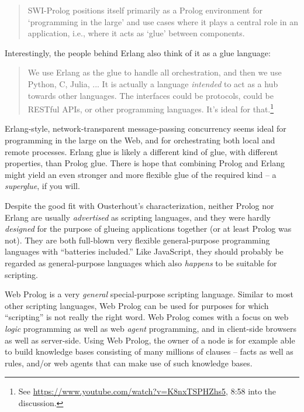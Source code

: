 \begin{quote}
SWI-Prolog positions itself primarily as a Prolog environment for `programming in the large' and use cases where it plays a central role in an application, i.e., where it acts as `glue' between components. 
\end{quote}

\noindent Interestingly, the people behind Erlang also think of it as a glue language: 

\begin{quote}
We use Erlang as the glue to handle all orchestration, and then we use Python, C, Julia, ... It is actually a language \textit{intended} to act as a hub towards other languages. The interfaces could be protocols, could be RESTful APIs, or other programming languages. It's ideal for that.\footnote{See \url{https://www.youtube.com/watch?v=K8nxTSPHZhs5}, 8:58 into the discussion.}
\end{quote}

\noindent Erlang-style, network-transparent message-passing concurrency seems ideal for programming in the large on the Web, and for orchestrating both local and remote processes. 
Erlang glue is likely a different kind of glue, with different properties, than Prolog glue. There is hope that combining Prolog and Erlang might yield an even stronger and more flexible glue of the required kind -- a \textit{superglue}, if you will.

Despite the good fit with Ousterhout's characterization, neither Prolog nor Erlang are usually \textit{advertised} as scripting languages, and they were hardly \textit{designed} for the purpose of glueing applications together (or at least Prolog was not). They are both full-blown very flexible general-purpose programming languages with ``batteries included.'' Like JavaScript, they should probably be regarded as general-purpose languages which also \textit{happens} to be suitable for scripting. %

Web Prolog is a very \textit{general} special-purpose scripting language. Similar to most other scripting languages, Web Prolog can be used for purposes for which ``scripting'' is not really the right word. Web Prolog comes with a focus on web \textit{logic} programming as well as web \textit{agent} programming, and in client-side browsers as well as server-side. Using Web Prolog, the owner of a node is for example able to build knowledge bases consisting of many millions of clauses -- facts as well as rules, and/or web agents that can make use of such knowledge bases.

